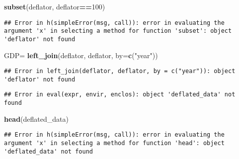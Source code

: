 \documentclass[
]{article}
\newenvironment{Shaded}{\begin{snugshade}}{\end{snugshade}}
\newcommand{\DataTypeTok}[1]{\textcolor[rgb]{0.13,0.29,0.53}{#1}}
\newcommand{\DecValTok}[1]{\textcolor[rgb]{0.00,0.00,0.81}{#1}}
\newcommand{\KeywordTok}[1]{\textcolor[rgb]{0.13,0.29,0.53}{\textbf{#1}}}
\newcommand{\NormalTok}[1]{#1}
\newcommand{\OperatorTok}[1]{\textcolor[rgb]{0.81,0.36,0.00}{\textbf{#1}}}
\newcommand{\StringTok}[1]{\textcolor[rgb]{0.31,0.60,0.02}{#1}}
\begin{document}
\begin{Shaded}
\begin{Highlighting}[]
\KeywordTok{subset}\NormalTok{(deflator, deflator}\OperatorTok{==}\DecValTok{100}\NormalTok{)}
\end{Highlighting}
\end{Shaded}

\begin{verbatim}
## Error in h(simpleError(msg, call)): error in evaluating the argument 'x' in selecting a method for function 'subset': object 'deflator' not found
\end{verbatim}

\begin{Shaded}
\begin{Highlighting}[]
\NormalTok{GDP=}\StringTok{ }\KeywordTok{left_join}\NormalTok{(deflator,}
\NormalTok{deflator,}
\DataTypeTok{by=}\KeywordTok{c}\NormalTok{(}\StringTok{"year"}\NormalTok{))}
\end{Highlighting}
\end{Shaded}

\begin{verbatim}
## Error in left_join(deflator, deflator, by = c("year")): object 'deflator' not found
\end{verbatim}

\begin{Shaded}
\end{Shaded}

\begin{verbatim}
## Error in eval(expr, envir, enclos): object 'deflated_data' not found
\end{verbatim}

\begin{Shaded}
\begin{Highlighting}[]
\KeywordTok{head}\NormalTok{(deflated_data)}
\end{Highlighting}
\end{Shaded}

\begin{verbatim}
## Error in h(simpleError(msg, call)): error in evaluating the argument 'x' in selecting a method for function 'head': object 'deflated_data' not found
\end{verbatim}
\end{document}
